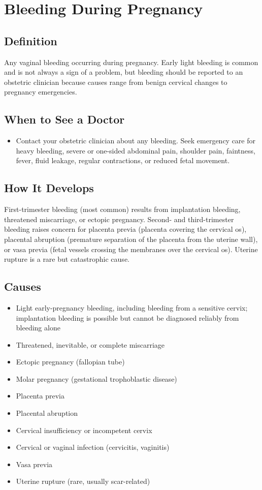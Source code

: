 \chapter{Bleeding During Pregnancy}

\section*{Definition}
Any vaginal bleeding occurring during pregnancy. Early light bleeding is common and is not always a sign of a problem, but bleeding should be reported to an obstetric clinician because causes range from benign cervical changes to pregnancy emergencies.

\section*{When to See a Doctor}

\begin{itemize}
 \item Contact your obstetric clinician about any bleeding. Seek emergency care for heavy bleeding, severe or one-sided abdominal pain, shoulder pain, faintness, fever, fluid leakage, regular contractions, or reduced fetal movement.
\end{itemize}

\section*{How It Develops}
First-trimester bleeding (most common) results from implantation bleeding, threatened miscarriage, or ectopic pregnancy. Second- and third-trimester bleeding raises concern for placenta previa (placenta covering the cervical os), placental abruption (premature separation of the placenta from the uterine wall), or vasa previa (fetal vessels crossing the membranes over the cervical os). Uterine rupture is a rare but catastrophic cause.

\section*{Causes}
\begin{itemize}
 \item Light early-pregnancy bleeding, including bleeding from a sensitive cervix; implantation bleeding is possible but cannot be diagnosed reliably from bleeding alone
 \item Threatened, inevitable, or complete miscarriage
 \item Ectopic pregnancy (fallopian tube)
 \item Molar pregnancy (gestational trophoblastic disease)
 \item Placenta previa
 \item Placental abruption
 \item Cervical insufficiency or incompetent cervix
 \item Cervical or vaginal infection (cervicitis, vaginitis)
 \item Vasa previa
 \item Uterine rupture (rare, usually scar-related)
\end{itemize}

